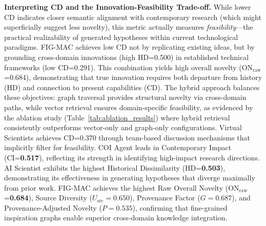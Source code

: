 \documentclass[runningheads]{llncs}
\begin{document}
\textbf{Interpreting CD and the Innovation-Feasibility Trade-off.} While lower CD indicates closer semantic alignment with contemporary research (which might superficially suggest less novelty), this metric actually measures \textit{feasibility}---the practical realizability of generated hypotheses within current technological paradigms. FIG-MAC achieves low CD not by replicating existing ideas, but by grounding cross-domain innovations (high HD=0.500) in established technical frameworks (low CD=0.291). This combination yields high overall novelty (ON$_{\text{raw}}$=0.684), demonstrating that true innovation requires both departure from history (HD) and connection to present capabilities (CD). The hybrid approach balances these objectives: graph traversal provides structural novelty via cross-domain paths, while vector retrieval ensures domain-specific feasibility, as evidenced by the ablation study (Table~\ref{tab:ablation_results}) where hybrid retrieval consistently outperforms vector-only and graph-only configurations. Virtual Scientists achieves CD=0.370 through team-based discussion mechanisms that implicitly filter for feasibility. COI Agent leads in Contemporary Impact (CI=\textbf{0.517}), reflecting its strength in identifying high-impact research directions. AI Scientist exhibits the highest Historical Dissimilarity (HD=\textbf{0.503}), demonstrating its effectiveness in generating hypotheses that diverge maximally from prior work. FIG-MAC achieves the highest Raw Overall Novelty (ON$_{\text{raw}}$=\textbf{0.684}), Source Diversity ($U_{\text{src}}=\mathbf{0.650}$), Provenance Factor ($G=\mathbf{0.687}$), and Provenance-Adjusted Novelty ($P=\mathbf{0.535}$), confirming that fine-grained inspiration graphs enable superior cross-domain knowledge integration.
\end{document}
